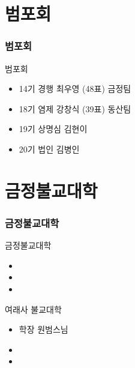 \documentclass[aspectratio=1610,20pt,xcolor=pdftex,dvipsnames,table,handout]{beamer}
\begin{document}
		\begin{frame} [t,plain]
		\end{frame}						


		\section{범포회}
		\begin{frame} [t,plain]
		\frametitle{범포회}
			\begin{block} {범포회}
			\setlength{\leftmargini}{1em}			
			\begin{itemize}
				\item 14기 경행 최우영 (48표) 금정팀
				\item 18기 염제 강창식 (39표) 동산팀
				\item 19기 상명심 김현이
				\item 20기 법인 김병인
			\end{itemize}
			\end{block}						
		\end{frame}						



		\section{금정불교대학}

		\begin{frame} [t,plain]
		\frametitle{금정불교대학}

			\begin{block} {금정불교대학}
			\setlength{\leftmargini}{2em}			
			\begin{itemize}
				\item 
				\item 
				\item 
			\end{itemize}
			\end{block}						


			\begin{block} {여래사 불교대학}
			\setlength{\leftmargini}{2em}			
			\begin{itemize}
				\item 학장 원범스님
				\item 
				\item 
			\end{itemize}
			\end{block}						

		\end{frame}						
\end{document}
